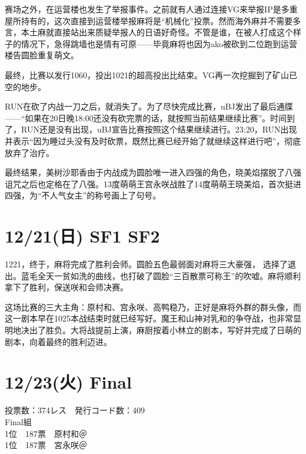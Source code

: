 赛场之外，在运营楼也发生了举报事件。之前就有人通过连接VG来举报IP是多重屋所持有的，这次直接到运营楼举报麻将是“机械化”投票。然而海外麻并不需要多言，本土麻就直接站出来质疑举报人的日语好奇怪。不管是谁，在被人打成这个样子的情况下，急得跳墙也是情有可原——毕竟麻将也因为ako被砍到二位跑到运营楼告圆脸重复萌文。

最终，比赛以发行1060，投出1021的超高投出比结束。VG再一次挖掘到了矿山已空的地步。

RUN在砍了内战一刀之后，就消失了。为了尽快完成比赛，uBJ发出了最后通牒——“如果在20日晚18:00还没有砍完票的话，就按照当前结果继续比赛”。时间到了，RUN还是没有出现，uBJ宣告比赛按照这个结果继续进行。23:20，RUN出现并表示“因为睡过头没有及时砍票，既然比赛已经开始了就继续这样进行吧”，彻底放弃了治疗。

最终结果，美树沙耶香由于内战成为圆脸唯一进入四强的角色，晓美焰摆脱了八强诅咒之后也定格在了八强。13度萌萌王宫永咲战胜了14度萌萌王晓美焰，首次挺进四强，为“不人气女主”的称号画上了句号。

\section{12/21(日) SF1 SF2}



1221，终于，麻将完成了胜利会师。圆脸五色最弱面对麻将三大豪强， 选择了退出。蓝毛全天一贫如洗的曲线，也打破了圆脸“三百散票可称王”的吹嘘。麻将顺利拿下了胜利，保送咲和会师决赛。

这场比赛的三大主角：原村和、宫永咲、高鸭稳乃，正好是麻将外群的群头像，而这一剧本早在1025本战结束时就已经写好。魔王和山神对乳和的争夺战，也非常显明地决出了胜负。大将战提前上演，麻厨按着小林立的剧本，写好并完成了日萌的剧本，向着最终的胜利迈进。

\section{12/23(火) Final}

\begin{minipage}[t]{.45\textwidth}\VoteFont
  投票数：374レス　発行コード数：409\\
  Final組\\
  1位　187票　原村和＠\Saki\\
  1位　187票　宮永咲＠\Saki
\end{minipage}

